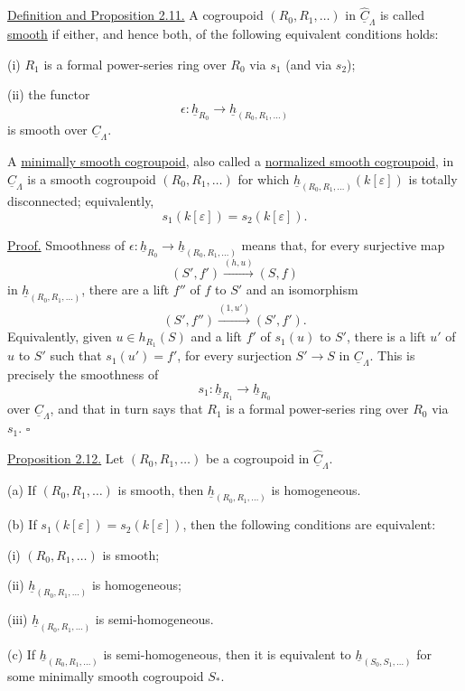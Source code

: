 \underline{Definition and Proposition 2.11.} A cogroupoid
$(R_0,R_1,\ldots)$ in $\widehat{\underline C}_\Lambda$ is called
\underline{smooth} if either, and hence both, of the following
equivalent conditions holds:

(i) $R_1$ is a formal power-series ring over $R_0$ via $s_1$ (and
via $s_2$);

(ii) the functor
\[
 \epsilon:\underline h_{R_0}
 \longrightarrow\underline h_{(R_0,R_1,\ldots)}
\]
is smooth over $\underline C_\Lambda$.

A \underline{minimally smooth cogroupoid}, also called a
\underline{normalized smooth cogroupoid}, in
$\widehat{\underline C}_\Lambda$ is a smooth cogroupoid
$(R_0,R_1,\ldots)$ for which
$\underline h_{(R_0,R_1,\ldots)}(k[\varepsilon])$ is totally
disconnected; equivalently,
\[
 s_1(k[\varepsilon])=s_2(k[\varepsilon]).
\]

\underline{Proof.} Smoothness of
$\epsilon:\underline h_{R_0}\to
\underline h_{(R_0,R_1,\ldots)}$ means that, for every surjective
map
\[
 (S',f')\xrightarrow{(h,u)}(S,f)
\]
in $\underline h_{(R_0,R_1,\ldots)}$, there are a lift $f''$ of $f$
to $S'$ and an isomorphism
\[
 (S',f'')\xrightarrow{(1,u')}(S',f').
\]
Equivalently, given $u\in h_{R_1}(S)$ and a lift $f'$ of $s_1(u)$
to $S'$, there is a lift $u'$ of $u$ to $S'$ such that
$s_1(u')=f'$, for every surjection $S'\to S$ in
$\underline C_\Lambda$. This is precisely the smoothness of
\[
 s_1:\underline h_{R_1}\longrightarrow\underline h_{R_0}
\]
over $\underline C_\Lambda$, and that in turn says that $R_1$ is a
formal power-series ring over $R_0$ via $s_1$. \hfill$\square$

\underline{Proposition 2.12.} Let $(R_0,R_1,\ldots)$ be a cogroupoid
in $\widehat{\underline C}_\Lambda$.

(a) If $(R_0,R_1,\ldots)$ is smooth, then
$\underline h_{(R_0,R_1,\ldots)}$ is homogeneous.

(b) If $s_1(k[\varepsilon])=s_2(k[\varepsilon])$, then the following
conditions are equivalent:

(i) $(R_0,R_1,\ldots)$ is smooth;

(ii) $\underline h_{(R_0,R_1,\ldots)}$ is homogeneous;

(iii) $\underline h_{(R_0,R_1,\ldots)}$ is semi-homogeneous.


(c) If $\underline h_{(R_0,R_1,\ldots)}$ is semi-homogeneous, then
it is equivalent to $\underline h_{(S_0,S_1,\ldots)}$ for some
minimally smooth cogroupoid $S_*$. 

